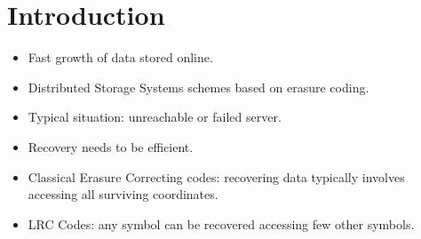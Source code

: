 \section{Introduction}
\begin{frame}
\begin{itemize}
\item Fast growth of data stored online.

\item Distributed Storage Systems schemes based on erasure coding.

\item Typical situation: unreachable or failed server.

\item Recovery needs to be efficient.

\item Classical Erasure Correcting codes: recovering data typically involves accessing all surviving coordinates.

\item LRC Codes: any symbol can be recovered accessing few other symbols.

\end{itemize}
\end{frame}